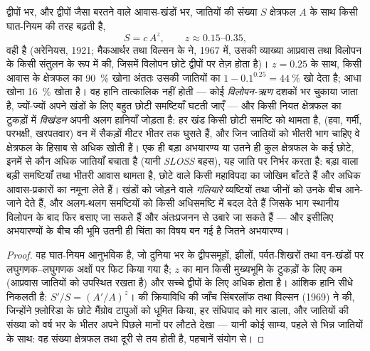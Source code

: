 \begin{proposition}[जातियाँ और क्षेत्रफल]\label{prop:b3:conservation-biology:area}
द्वीपों भर, और द्वीपों जैसा बरतने वाले आवास-खंडों भर, जातियों की संख्या
$S$ क्षेत्रफल $A$ के साथ किसी घात-नियम की तरह बढ़ती है,
\[
S = c\,A^{z}, \qquad z \approx 0.15\text{--}0.35,
\]
वही \emph{} है (अरेनियस, 1921; मैकआर्थर तथा विल्सन
के  ने, 1967 में, उसकी व्याख्या आप्रवास तथा विलोपन के किसी
संतुलन के रूप में की, जिसमें विलोपन छोटे द्वीपों पर तेज़ होता है)।
$z = 0.25$ के साथ, किसी आवास के क्षेत्रफल का \qty{90}{\%} खोना अंततः
उसकी जातियों का $1 - 0.1^{0.25} = \qty{44}{\%}$ खो देता है; आधा खोना
\qty{16}{\%} खोता है। वह हानि तात्कालिक नहीं होती --- कोई
\emph{विलोपन-ऋण} दशकों भर चुकाया जाता है, ज्यों-ज्यों अपने खंडों के लिए
बहुत छोटी समष्टियाँ घटती जाएँ --- और किसी नियत क्षेत्रफल का टुकड़ों में
\emph{विखंडन} अपनी अलग हानियाँ जोड़ता है: हर खंड किसी छोटी समष्टि को
थामता है, \emph{} (हवा, गर्मी, परभक्षी, खरपतवार) वन में
सैकड़ों मीटर भीतर तक घुसते हैं, और जिन जातियों को भीतरी भाग चाहिए वे
क्षेत्रफल के हिसाब से अधिक खोती हैं। एक ही बड़ा अभयारण्य या उतने ही कुल
क्षेत्रफल के कई छोटे, इनमें से कौन अधिक जातियाँ बचाता है (यानी
\emph{SLOSS} बहस), यह जाति पर निर्भर करता है: बड़ा वाला बड़ी समष्टियाँ
तथा भीतरी आवास थामता है, छोटे वाले किसी महाविपदा का जोखिम बाँटते हैं और
अधिक आवास-प्रकारों का नमूना लेते हैं। खंडों को जोड़ने वाले
\emph{गलियारे} व्यष्टियों तथा जीनों को उनके बीच आने-जाने देते हैं, और
अलग-थलग समष्टियों को किसी अधिसमष्टि में बदल देते हैं जिसके भाग स्थानीय
विलोपन के बाद फिर बसाए जा सकते हैं और अंतःप्रजनन से उबारे जा सकते हैं
--- और इसीलिए अभयारण्यों के बीच की भूमि उतनी ही चिंता का विषय बन गई है
जितने अभयारण्य।
\end{proposition}
\begin{proof}
वह घात-नियम आनुभविक है, जो दुनिया भर के द्वीपसमूहों, झीलों,
पर्वत-शिखरों तथा वन-खंडों पर लघुगणक--लघुगणक अक्षों पर फिट किया गया है;
$z$ का मान किसी मुख्यभूमि के टुकड़ों के लिए कम (आप्रवास जातियों को
उपस्थित रखता है) और सच्चे द्वीपों के लिए अधिक होता है। आंशिक हानि सीधे
निकलती है: $S'/S = (A'/A)^{z}$।  की क्रियाविधि की जाँच
सिंबरलॉफ तथा विल्सन (1969) ने की, जिन्होंने फ़्लोरिडा के छोटे मैंग्रोव
टापुओं को धूमित किया, हर संधिपाद को मार डाला, और जातियों की संख्या को
वर्ष भर के भीतर अपने पिछले मानों पर लौटते देखा --- यानी कोई साम्य, पहले
से भिन्न जातियों के साथ: वह संख्या क्षेत्रफल तथा दूरी से तय होती है,
पहचानें संयोग से।
\end{proof}

